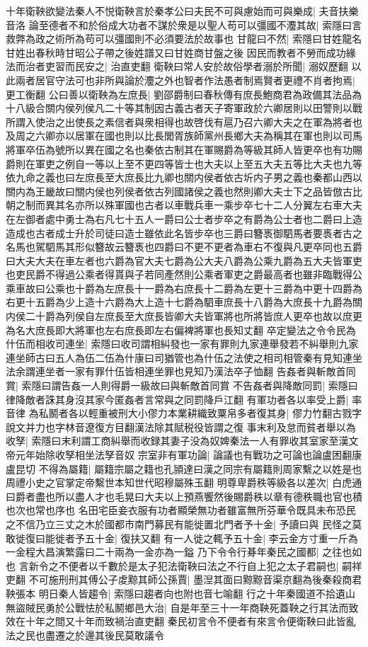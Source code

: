 十年衛鞅欲變法秦人不悦衛鞅言於秦孝公曰夫民不可與慮始而可與樂成|{
	夫音扶樂音洛}
論至德者不和於俗成大功者不謀於衆是以聖人苟可以彊國不灋其故|{
	索隱曰言救弊為政之術所為苟可以彊國則不必須要法於故事也}
甘龍曰不然|{
	索隱曰甘姓龍名甘姓出春秋時甘昭公子帶之後姓譜又曰甘姓商甘盤之後}
因民而教者不勞而成功緣法而治者吏習而民安之|{
	治直吏翻}
衛鞅曰常人安於故俗學者溺於所聞|{
	溺奴歷翻}
以此兩者居官守法可也非所與論於灋之外也智者作法愚者制焉賢者更禮不肖者拘焉|{
	更工衡翻}
公曰善以衛鞅為左庶長|{
	劉邵爵制曰春秋傳有庶長鮑商君為政備其法品為十八級合關内侯列侯凡二十等其制因古義古者天子寄軍政於六卿居則以田警則以戰所謂入使治之出使長之素信者與衆相得也故啓伐有扈乃召六卿大夫之在軍為將者也及周之六卿亦以居軍在國也則以比長閭胥族師黨州長鄉大夫為稱其在軍也則以司馬將軍卒伍為號所以異在國之名也秦依古制其在軍賜爵為等級其師人皆更卒也有功賜爵則在軍吏之例自一等以上至不更四等皆士也大夫以上至五大夫五等比大夫也九等依九命之義也曰左庶長至大庶長比九卿也關内侯者依古圻内子男之義也秦都山西以關内為王畿故曰關内侯也列侯者依古列國諸侯之義也然則卿大夫士下之品皆倣古比朝之制而異其名亦所以殊軍國也古者以車戰兵車一乘步卒七十二人分翼左右車大夫在左御者處中勇士為右凡七十五人一爵曰公士者步卒之有爵為公士者也二爵曰上造造成也古者成士升於司徒曰造士雖依此名皆步卒也三爵曰簪褭御駟馬者要褭者古之名馬也駕駟馬其形似簪故云簪褭也四爵曰不更不更者為車右不復與凡更卒同也五爵曰大夫大夫在車左者也六爵為官大夫七爵為公大夫八爵為公乘九爵為五大夫皆軍吏也吏民爵不得過公乘者得貰與子若同產然則公乘者軍吏之爵最高者也雖非臨戰得公乘車故曰公乘也十爵為左庶長十一爵為右庶長十二爵為左更十三爵為中更十四爵為右更十五爵為少上造十六爵為大上造十七爵為駟車庶長十八爵為大庶長十九爵為關内侯二十爵為列侯自左庶長至大庶長皆卿大夫皆軍將也所將皆庶人更卒也故以庶更為名大庶長即大將軍也左右庶長即左右偏裨將軍也長知丈翻}
卒定變法之令令民為什伍而相收司連坐|{
	索隱曰收司謂相糾發也一家有罪則九家連舉發若不糾舉則九家連坐師古曰五人為伍二伍為什康曰司猶管也為什伍之法使之相司相管秦有見知連坐法余謂連坐者一家有罪什伍皆相連坐罪也見知乃漢法卒子恤翻}
告姦者與斬敵首同賞|{
	索隱曰謂告姦一人則得爵一級故曰與斬敵首同賞}
不告姦者與降敵同罰|{
	索隱曰律降敵者誅其身沒其家今匿姦者言常與之同罰降戶江翻}
有軍功者各以率受上爵|{
	率音律}
為私鬭者各以輕重被刑大小僇力本業耕織致粟帛多者復其身|{
	僇力竹翻古戮字說文并力也字林音遼復方目翻漢法除其賦税役皆謂之復}
事末利及怠而貧者舉以為收孥|{
	索隱曰末利謂工商糾舉而收録其妻子没為奴婢秦法一人有罪收其室家至漢文帝元年始除收孥相坐法孥音奴}
宗室非有軍功論|{
	論議也有戰功之可論也論盧困翻康盧昆切}
不得為屬籍|{
	屬籍宗屬之籍也孔頴達曰漢之同宗有屬籍則周家繫之以姓是也周禮小史之官掌定帝繫世本知世代昭穆屬殊玉翻}
明尊卑爵秩等級各以差次|{
	白虎通曰爵者盡也所以盡人才也毛晃曰大夫以上預燕饗然後賜爵秩以章有德秩職也官也積也次也常也序也}
名田宅臣妾衣服有功者顯榮無功者雖富無所芬華令既具未布恐民之不信乃立三丈之木於國都市南門募民有能徙置北門者予十金|{
	予讀曰與}
民怪之莫敢徙復曰能徙者予五十金|{
	復扶又翻}
有一人徙之輒予五十金|{
	李云金方寸重一斤為一金程大昌演繁露曰二十兩為一金亦為一鎰}
乃下令令行朞年秦民之國都|{
	之往也如也}
言新令之不便者以千數於是太子犯法衛鞅曰法之不行自上犯之太子君嗣也|{
	嗣祥吏翻}
不可施刑刑其傅公子䖍黥其師公孫賈|{
	墨湼其面曰黥黥音渠京翻為後秦殺商君鞅張本}
明日秦人皆趨令|{
	索隱曰趨者向也附也音七喻翻}
行之十年秦國道不拾遺山無盜賊民勇於公戰怯於私鬭鄉邑大治|{
	自是年至三十一年商鞅死蓋鞅之行其法而致效在十年之間又十年而致禍治直吏翻}
秦民初言令不便者有來言令便衛鞅曰此皆亂法之民也盡遷之於邊其後民莫敢議令


